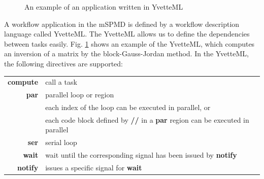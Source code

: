 \documentclass[graybox]{svmult}
\begin{document}
\begin{figure}[t]
 \begin{center}
  \caption{An example of an application written in YvetteML}
  \label{figure:app-yvetteml}
 \end{center}
\end{figure}

A workflow application in the mSPMD is defined by a workflow description language called YvetteML. 
The YvetteML allows us to define the dependencies between tasks easily. 
Fig. \ref{figure:app-yvetteml} shows an example of the YvetteML, which computes an inversion of a matrix  by the block-Gauss-Jordan method. 
In the YvetteML, the following directives are supported:\\
\begin{tabular}[t]{rl}
 {\bf compute}& call a task \\
 {\bf par} & parallel loop or region\\
           & each index of the loop can be executed in parallel, or\\ 
           & each code block defined by {\bf // }in a {\bf par} region can be executed in parallel\\
 {\bf ser} & serial loop\\
 {\bf wait} & wait until the corresponding signal has been issued by {\bf notify}\\
 {\bf notify} & issues a specific signal for {\bf wait}
\end{tabular}
\end{document}
